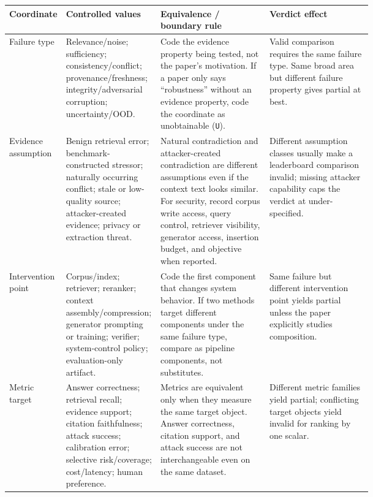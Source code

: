 \documentclass[11pt]{article}
\begin{document}
\begin{table}[t]
\centering
\scriptsize
\renewcommand{\arraystretch}{0.88}
\begin{tabularx}{\linewidth}{>{\raggedright\arraybackslash}p{0.13\linewidth}>{\raggedright\arraybackslash}p{0.26\linewidth}>{\raggedright\arraybackslash}p{0.30\linewidth}X}
\toprule
\textbf{Coordinate} & \textbf{Controlled values} & \textbf{Equivalence / boundary rule} & \textbf{Verdict effect} \\
\midrule
Failure type & Relevance/noise; sufficiency; consistency/conflict; provenance/freshness; integrity/adversarial corruption; uncertainty/OOD. & Code the evidence property being tested, not the paper's motivation. If a paper only says ``robustness'' without an evidence property, code the coordinate as unobtainable (\texttt{U}). & Valid comparison requires the same failure type. Same broad area but different failure property gives partial at best. \\
Evidence assumption & Benign retrieval error; benchmark-constructed stressor; naturally occurring conflict; stale or low-quality source; attacker-created evidence; privacy or extraction threat. & Natural contradiction and attacker-created contradiction are different assumptions even if the context text looks similar. For security, record corpus write access, query control, retriever visibility, generator access, insertion budget, and objective when reported. & Different assumption classes usually make a leaderboard comparison invalid; missing attacker capability caps the verdict at under-specified. \\
Intervention point & Corpus/index; retriever; reranker; context assembly/compression; generator prompting or training; verifier; system-control policy; evaluation-only artifact. & Code the first component that changes system behavior. If two methods target different components under the same failure type, compare as pipeline components, not substitutes. & Same failure but different intervention point yields partial unless the paper explicitly studies composition. \\
Metric target & Answer correctness; retrieval recall; evidence support; citation faithfulness; attack success; calibration error; selective risk/coverage; cost/latency; human preference. & Metrics are equivalent only when they measure the same target object. Answer correctness, citation support, and attack success are not interchangeable even on the same dataset. & Different metric families yield partial; conflicting target objects yield invalid for ranking by one scalar. \\

\end{tabularx}
\end{table}
\end{document}
